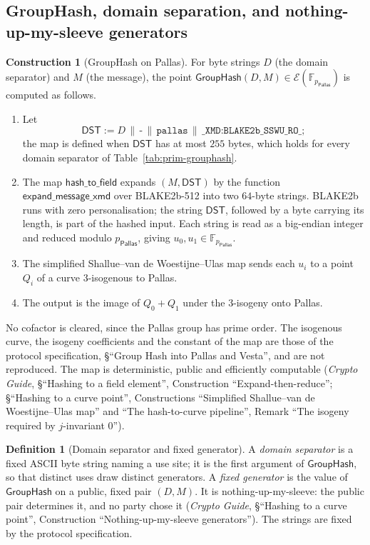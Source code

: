 \documentclass[11pt,a4paper]{article}
\theoremstyle{definition}
\newtheorem{definition}[theorem]{Definition}
\newtheorem{construction}[theorem]{Construction}
\newcommand{\F}{\mathbb{F}}
\newcommand{\Pallas}{\ensuremath{\mathsf{Pallas}}}
\newcommand{\Ep}{\ensuremath{\mathcal{E}}}
\newcommand{\GroupHash}{\ensuremath{\mathsf{GroupHash}}}
\begin{document}
\FloatBarrier
\subsection{GroupHash, domain separation, and nothing-up-my-sleeve
generators}\label{sec:prim-grouphash}

\begin{construction}[GroupHash on Pallas]
For byte strings $D$ (the domain separator) and $M$ (the message), the
point $\GroupHash(D, M) \in \Ep(\F_{p_{\Pallas}})$ is computed as follows.
\begin{enumerate}
\item Let
  \[
    \mathsf{DST} := D \,\|\, \texttt{-} \,\|\, \texttt{pallas} \,\|\,
    \texttt{\_XMD:BLAKE2b\_SSWU\_RO\_} ;
  \]
  the map is defined when $\mathsf{DST}$ has at most $255$ bytes, which
  holds for every domain separator of Table~\ref{tab:prim-grouphash}.
\item The map $\mathsf{hash\_to\_field}$ expands $(M, \mathsf{DST})$ by the
  function $\mathsf{expand\_message\_xmd}$ over BLAKE2b-512 into two
  $64$-byte strings. BLAKE2b runs with zero personalisation; the string
  $\mathsf{DST}$, followed by a byte carrying its length, is part of the
  hashed input. Each string is read as a big-endian integer and reduced
  modulo $p_{\Pallas}$, giving $u_0, u_1 \in \F_{p_{\Pallas}}$.
\item The simplified Shallue--van de Woestijne--Ulas map sends each $u_i$
  to a point $Q_i$ of a curve $3$-isogenous to Pallas.
\item The output is the image of $Q_0 + Q_1$ under the $3$-isogeny onto
  Pallas.
\end{enumerate}
No cofactor is cleared, since the Pallas group has prime order. The
isogenous curve, the isogeny coefficients and the constant of the map are
those of the protocol specification, \S``Group Hash into Pallas and
Vesta'', and are not reproduced. The map is deterministic, public and
efficiently computable (\emph{Crypto Guide}, \S``Hashing to a field
element'', Construction ``Expand-then-reduce''; \S``Hashing to a curve
point'', Constructions ``Simplified Shallue--van de Woestijne--Ulas map''
and ``The hash-to-curve pipeline'', Remark ``The isogeny required by $j$-invariant $0$'').
\end{construction}

\begin{definition}[Domain separator and fixed generator]
A \emph{domain separator} is a fixed ASCII byte string naming a use site; it
is the first argument of $\GroupHash$, so that distinct uses draw distinct
generators. A \emph{fixed generator} is the value of $\GroupHash$ on a
public, fixed pair $(D, M)$. It is nothing-up-my-sleeve: the public pair
determines it, and no party chose it (\emph{Crypto Guide}, \S``Hashing to a
curve point'', Construction ``Nothing-up-my-sleeve generators''). The
strings are fixed by the protocol specification.
\end{definition}
\end{document}
